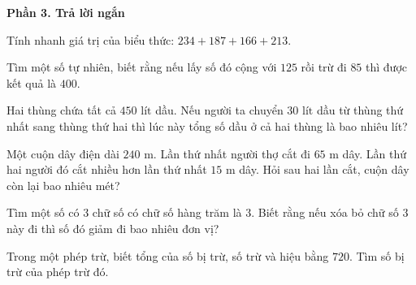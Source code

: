 \textbf{Phần 3. Trả lời ngắn}

\begin{ex} %
Tính nhanh giá trị của biểu thức: $234 + 187 + 166 + 213$.
\end{ex}

\begin{ex} %
Tìm một số tự nhiên, biết rằng nếu lấy số đó cộng với $125$ rồi trừ đi $85$ thì được kết quả là $400$.
\end{ex}

\begin{ex} %
Hai thùng chứa tất cả $450\text{ lít}$ dầu. Nếu người ta chuyển $30\text{ lít}$ dầu từ thùng thứ nhất sang thùng thứ hai thì lúc này tổng số dầu ở cả hai thùng là bao nhiêu lít?
\end{ex}

\begin{ex} %
Một cuộn dây điện dài $240\text{ m}$. Lần thứ nhất người thợ cắt đi $65\text{ m}$ dây. Lần thứ hai người đó cắt nhiều hơn lần thứ nhất $15\text{ m}$ dây. Hỏi sau hai lần cắt, cuộn dây còn lại bao nhiêu mét?
\end{ex}

\begin{ex} %
Tìm một số có 3 chữ số có chữ số hàng trăm là $3$. Biết rằng nếu xóa bỏ chữ số $3$ này đi thì số đó giảm đi bao nhiêu đơn vị?
\end{ex}

\begin{ex} %
Trong một phép trừ, biết tổng của số bị trừ, số trừ và hiệu bằng $720$. Tìm số bị trừ của phép trừ đó.
\end{ex}
